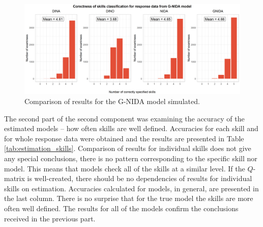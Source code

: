 \documentclass[english]{pwr_wmat_praca_dyplomowa}
\theoremstyle{plain}
\theoremstyle{definition}
\numberwithin{theorem}{chapter}
\begin{document}
\begin{figure}[h!]
	\centering
	\includegraphics[width=\textwidth]{GNIDA_skills_classification_col.png}
	\caption{Comparison of results for the G-NIDA model simulated.}
	\label{comparison_gnida}
\end{figure}

The second part of the second component was examining the accuracy of the estimated models -- how often skills are well defined. Accuracies for each skill and for whole response data were obtained and the results are presented in Table \ref{tab:estimation_skills}. Comparison of results for individual skills does not give any special conclusions, there is no pattern corresponding to the specific skill nor model. This means that models check all of the skills at a similar level. If the $Q$-matrix is well-created, there should be no dependencies of results for individual skills on estimation. Accuracies calculated for models, in general, are presented in the last column. There is no surprise that for the true model the skills are more often well defined. The results for all of the models confirm the conclusions received in the previous part.
\end{document}
